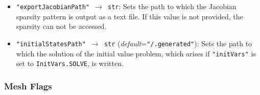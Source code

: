 \documentclass[12pt]{article}
\begin{document}
\begin{mdframed}[backgroundcolor=gray!10, roundcorner=10pt,
		linewidth=1pt]
\begin{itemize}
		      \label{flag:exportJacobianPath}
		\item \texttt{"exportJacobianPath" $\rightarrow$ str}: Sets the path to
		      which the Jacobian sparsity pattern is output as a text file. If this value is
		      not provided, the sparsity can not be accessed.

		      \label{flag:initialStatesPath}
		\item \texttt{"initialStatesPath" $\rightarrow$ str}
		      (\emph{default}=\texttt{"/.generated"}): Sets the path to which the solution of
		      the initial value problem, which arises if \texttt{"initVars"} is set to
		      \texttt{InitVars.SOLVE}, is written.

	\end{itemize}
\end{mdframed}

\subsubsection{Mesh Flags}
\label{c:meshflags}
\end{document}
